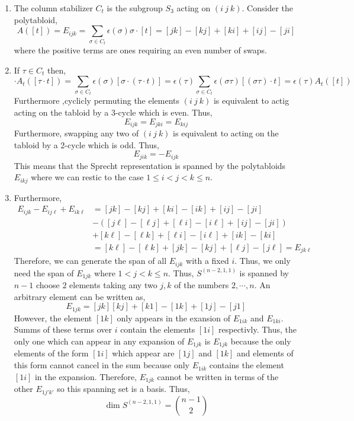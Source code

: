 \documentclass[12pt]{extarticle}
\begin{document}
\begin{enumerate}
\item 
The column stabilizer $C_t$ is the subgroup $S_3$ acting on $(i \: j \: k)$. 
Consider the polytabloid, 
\[ A([t]) = E_{ijk} = \sum_{\sigma \in C_t} \epsilon(\sigma) \sigma \cdot [t] = [jk] - [kj] + [ki] + [ij] - [ji] \]
where the positive terms are ones requiring an even number of swaps. 

\item If $\tau \in C_t$ then,
\[ \cdot A_t([\tau \cdot t]) = \sum_{\sigma \in C_t} \epsilon(\sigma) [\sigma \cdot (\tau \cdot t)] = \epsilon(\tau) \sum_{\sigma \in C_t}
\epsilon(\sigma \tau) [(\sigma \tau) \cdot t] = \epsilon(\tau) A_t([t]) \]
Furthermore ,cyclicly permuting the elements $(i \: j \: k)$ is equivalent to actig acting on the tabloid by a 3-cycle which is even. Thus,
\[ E_{ijk} = E_{jki} = E_{kij}\]
Furthermore, swapping any two of $(i \: j \: k)$ is equivalent to acting on the tabloid by a 2-cycle which is odd. Thus,
\[ E_{jik} = - E_{ijk} \]
This means that the Sprecht representation is spanned by the polytabloids $E_{ikj}$ where we can restic to the case $1 \le i < j < k \le n$. 
\item Furthermore,
\begin{align*}
E_{ijk} - E_{ij\ell} + E_{ik \ell} & = [jk] - [kj] + [ki] - [ik] + [ij] - [ji]
\\
& - \left( [j \ell] - [\ell j] + [\ell i] - [i \ell] + [i j] - [ji] \right)
\\
& + [k \ell] - [\ell k] + [\ell i] - [i \ell] + [i k] - [ki] 
\\
& = [k \ell] - [\ell k] + [jk] - [kj] + [\ell j] - [j \ell] = E_{jk \ell} 
\end{align*}
Therefore, we can generate the span of all $E_{ijk}$ with a fixed $i$. Thus, we only need the span of $E_{1jk}$ where $1 < j < k \le n$. Thus, $S^{(n-2, 1, 1)}$ is spanned by $n-1$ choose $2$ elements taking any two $j, k$ of the numbers $2, \cdots, n$. An arbitrary element can be written as,
\[ E_{1jk} = [jk]  [kj] + [k1] - [1k] + [1j] - [j1] \]
However, the element $[1k]$ only appears in the exansion of $E_{1ik}$ and $E_{1ki}$. Summs of these terms over $i$ contain the elements $[1i]$ respectivly. Thus, the only one which can appear in any expansion of $E_{1jk}$ is $E_{1jk}$ because the only elements of the form $[1i]$ which appear are $[1j]$ and $[1k]$ and elements of this form cannot cancel in the sum because only $E_{1ik}$ contains the element $[1i]$ in the expansion. Therefore, $E_{1jk}$ cannot be written in terms of the other $E_{1 j'k'}$ so this spanning set is a basis. Thus,
\[ \dim{S^{(n-2,1,1)}} = {n - 1 \choose 2} \]

\end{enumerate}
\end{document}
